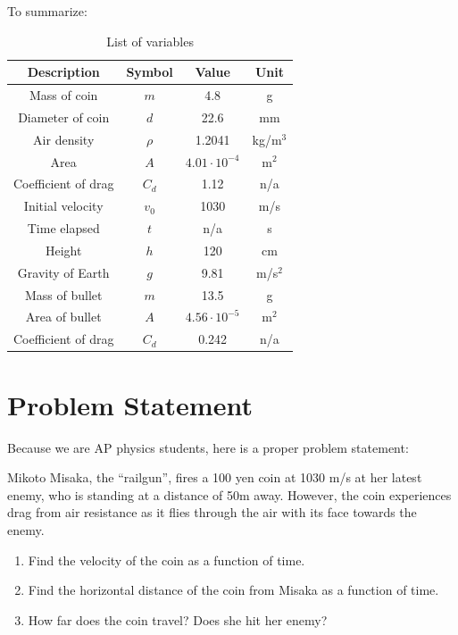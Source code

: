 \documentclass[11pt, oneside]{article}
\begin{document}
To summarize:
\begin{table}[h]
    \centering
    \begin{tabular}{| c | c | c | c |}
        \hline
        Description & Symbol & Value & Unit \\
        \hline
        Mass of coin & \( m \) & 4.8 & g \\
        Diameter of coin & \( d \) & 22.6 & mm \\
        Air density & \( \rho \) & 1.2041 & kg/m\(^3\) \\
        Area & \( A \) & \( 4.01 \cdot 10^{-4} \) & m\(^2\) \\
        Coefficient of drag & \( C_d \) & 1.12 & n/a \\
        Initial velocity & \( v_0 \) & 1030 & m/s \\ 
        Time elapsed & \( t \) & n/a & s \\
        Height & \( h \) & 120 & cm \\
        Gravity of Earth & \( g \) & 9.81 & m/s\(^2\) \\
        Mass of bullet & \( m \) & 13.5 & g \\
        Area of bullet & \( A \) & \( 4.56 \cdot 10^{-5} \) & m\(^2\) \\
        Coefficient of drag & \( C_d \) & 0.242 & n/a \\
        \hline
    \end{tabular}
    \caption{List of variables}
\end{table}

\section{Problem Statement}
Because we are AP physics students, here is a proper problem statement:

Mikoto Misaka, the ``railgun'', fires a 100 yen coin at 1030 m/s 
at her latest enemy, who is standing at a distance of 50m away.
However, the coin experiences drag from air resistance 
as it flies through the air with its face towards the enemy.
\begin{enumerate}[label=\alph*.]
    \item Find the velocity of the coin as a function of time.
    \item Find the horizontal distance of the coin from Misaka as a function of time.
    \item How far does the coin travel? Does she hit her enemy?
\end{enumerate}
\end{document}

